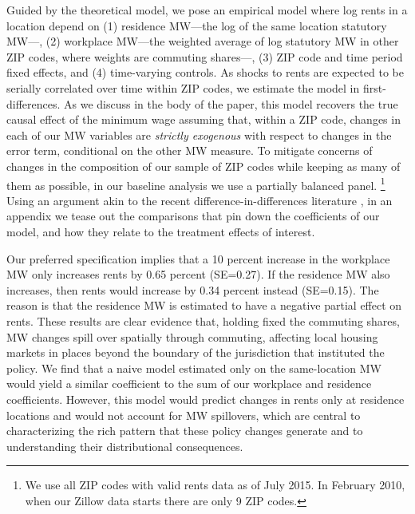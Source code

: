 Guided by the theoretical model, we pose an empirical model where log rents in 
a location depend on
(1) residence MW---the log of the same location statutory MW---,
(2) workplace MW---the weighted average of log statutory MW in other ZIP codes,
where weights are commuting shares---,
(3)  ZIP code and time period fixed effects,
and 
(4) time-varying controls.
As shocks to rents are expected to be serially correlated over time within ZIP codes, 
we estimate the model in first-differences.
As we discuss in the body of the paper, this model recovers the true causal effect
of the minimum wage assuming that, within a ZIP code, changes in each of our MW 
variables are \textit{strictly exogenous} with respect to changes in the error 
term, conditional on the other MW measure.
To mitigate concerns of changes in the composition of our sample of ZIP codes 
while keeping as many of them as possible, in our baseline analysis we use a 
partially balanced panel.%
\footnote{We use all ZIP codes with valid rents data as of July 2015. 
In February 2010, when our Zillow data starts there are only 9 ZIP codes.}
Using an argument akin to the recent difference-in-differences literature
\parencite[e.g.,][]{CallawaySantAnna2021,CallawayEtAl2021}, 
in an appendix we tease out the comparisons that pin down the coefficients of our 
model, and how they relate to the treatment effects of interest.


Our preferred specification implies that a 10 percent increase in the workplace
MW only increases rents by 0.65 percent (SE=0.27).
If the residence MW also increases, then rents would increase by 0.34 percent 
instead (SE=0.15).
The reason is that the residence MW is estimated to have a negative partial effect
on rents.
These results are clear evidence that, holding fixed the commuting shares, MW 
changes spill over spatially through commuting, affecting local housing markets 
in places beyond the boundary of the jurisdiction that instituted the policy.
We find that a naive model estimated only on the same-location MW would yield a 
similar coefficient to the sum of our workplace and residence coefficients.
However, this model would predict changes in rents only at residence locations and 
would not account for MW spillovers, which are central to characterizing the rich
pattern that these policy changes generate and to understanding their 
distributional consequences.

